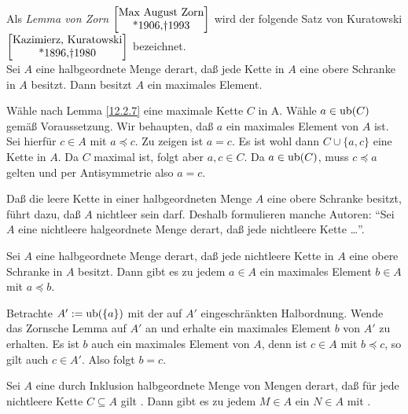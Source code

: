 \documentclass[../../main.tex]{subfiles}
\begin{document}
\begin{sat}\label{12.2.8}
	Als \emph{Lemma von Zorn} $\left[\begin{matrix*}\text{Max August Zorn}\\ \text{*1906,\dag 1993}\end{matrix*}\right]$ wird der folgende Satz von Kuratowski $\left[\begin{matrix*}\text{Kazimierz, Kuratowski}\\ \text{*1896,\dag 1980}\end{matrix*}\right]$ bezeichnet.\\
	Sei $A$ eine halbgeordnete Menge derart, daß jede Kette in $A$ eine obere Schranke in $A$ besitzt. Dann besitzt $A$ ein maximales Element.
\end{sat}
\begin{cproof}
	Wähle nach Lemma \eqref{12.2.7} eine maximale Kette $C$ in A. Wähle $a\in\operatorname{ub}(C)$ gemäß Voraussetzung. Wir behaupten, daß $a$ ein maximales Element von $A$ ist. Sei hierfür $c\in A$ mit $a\preceq c$. Zu zeigen ist $a=c$. Es ist wohl dann $C\cup\{a,c\}$ eine Kette in $A$. Da $C$ maximal ist, folgt aber $a,c\in C$. Da $a\in\operatorname{ub}(C)$, muss $c\preceq a$ gelten und per Antisymmetrie also $a=c$.
\end{cproof}

\begin{bem}\label{12.2.9}
	Daß die leere Kette in einer halbgeordneten Menge $A$ eine obere Schranke besitzt, führt dazu, daß $A$ nichtleer sein darf. Deshalb formulieren manche Autoren: \enquote{Sei $A$ eine nichtleere halgeordnete Menge derart, daß jede nichtleere Kette \ldots}.
\end{bem}

\begin{kor}\label{12.2.10}
	Sei $A$ eine halbgeordnete Menge derart, daß jede nichtleere Kette in $A$ eine obere Schranke in $A$ besitzt. Dann gibt es zu jedem $a\in A$ ein maximales Element $b\in A$ mit $a\preceq b$.
\end{kor}
\begin{cproof}
	Betrachte $A':=\operatorname{ub}(\{a\})$ mit der auf $A'$ eingeschränkten Halbordnung. Wende das Zornsche Lemma auf $A'$ an und erhalte ein maximales Element $b$ von $A'$ zu erhalten. Es ist $b$ auch ein maximales Element von $A$, denn ist $c\in A$ mit $b\preceq c$, so gilt auch $c\in A'$. Also folgt $b=c$.
\end{cproof}

\begin{kor}\label{12.2.11}
	Sei $A$ eine durch Inklusion halbgeordnete Menge von Mengen derart, daß für jede nichtleere Kette $C\subseteq A$ gilt . Dann gibt es zu jedem $M\in A$ ein  $N\in A$ mit .
\end{kor}
\end{document}
